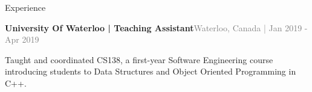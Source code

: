 \documentclass[hidelinks]{resume} %
\begin{document}
\begin{rSection}{Experience}
\begin{rSubsection}{\textbf{University Of Waterloo | Teaching Assistant}}{\textcolor{gray}{\small Waterloo, Canada | Jan 2019 - Apr 2019}}{}
    \begin{bulletpoints}
        \vspace{-.07cm}
        \item Taught and coordinated CS138, a first-year Software Engineering course introducing students to Data Structures and Object Oriented Programming in C++.
        \vspace{-.13cm}
    \end{bulletpoints}   

\end{rSubsection}

\end{rSection}

\vspace{-.1cm}
\end{document}
